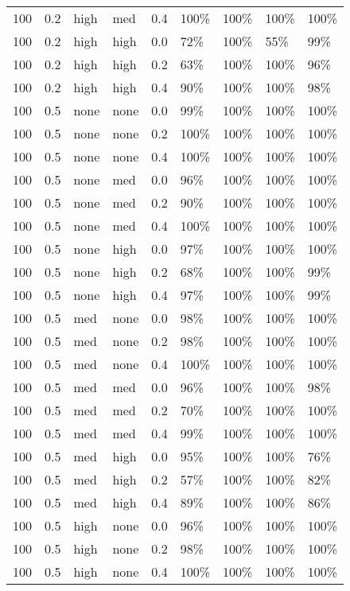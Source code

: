 \begin{longtable}{rrllrllll}
  100 & 0.2 & high & med & 0.4 & 100\% & 100\% & 100\% & 100\% \\ 
  100 & 0.2 & high & high & 0.0 & 72\% & 100\% & 55\% & 99\% \\ 
  100 & 0.2 & high & high & 0.2 & 63\% & 100\% & 100\% & 96\% \\ 
  100 & 0.2 & high & high & 0.4 & 90\% & 100\% & 100\% & 98\% \\ 
  100 & 0.5 & none & none & 0.0 & 99\% & 100\% & 100\% & 100\% \\ 
  100 & 0.5 & none & none & 0.2 & 100\% & 100\% & 100\% & 100\% \\ 
  100 & 0.5 & none & none & 0.4 & 100\% & 100\% & 100\% & 100\% \\ 
  100 & 0.5 & none & med & 0.0 & 96\% & 100\% & 100\% & 100\% \\ 
  100 & 0.5 & none & med & 0.2 & 90\% & 100\% & 100\% & 100\% \\ 
  100 & 0.5 & none & med & 0.4 & 100\% & 100\% & 100\% & 100\% \\ 
  100 & 0.5 & none & high & 0.0 & 97\% & 100\% & 100\% & 100\% \\ 
  100 & 0.5 & none & high & 0.2 & 68\% & 100\% & 100\% & 99\% \\ 
  100 & 0.5 & none & high & 0.4 & 97\% & 100\% & 100\% & 99\% \\ 
  100 & 0.5 & med & none & 0.0 & 98\% & 100\% & 100\% & 100\% \\ 
  100 & 0.5 & med & none & 0.2 & 98\% & 100\% & 100\% & 100\% \\ 
  100 & 0.5 & med & none & 0.4 & 100\% & 100\% & 100\% & 100\% \\ 
  100 & 0.5 & med & med & 0.0 & 96\% & 100\% & 100\% & 98\% \\ 
  100 & 0.5 & med & med & 0.2 & 70\% & 100\% & 100\% & 100\% \\ 
  100 & 0.5 & med & med & 0.4 & 99\% & 100\% & 100\% & 100\% \\ 
  100 & 0.5 & med & high & 0.0 & 95\% & 100\% & 100\% & 76\% \\ 
  100 & 0.5 & med & high & 0.2 & 57\% & 100\% & 100\% & 82\% \\ 
  100 & 0.5 & med & high & 0.4 & 89\% & 100\% & 100\% & 86\% \\ 
  100 & 0.5 & high & none & 0.0 & 96\% & 100\% & 100\% & 100\% \\ 
  100 & 0.5 & high & none & 0.2 & 98\% & 100\% & 100\% & 100\% \\ 
  100 & 0.5 & high & none & 0.4 & 100\% & 100\% & 100\% & 100\% \\ 

\end{longtable}
